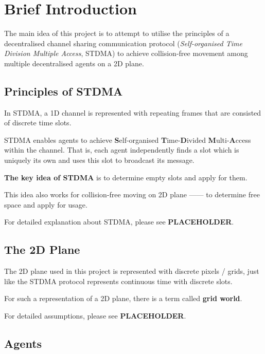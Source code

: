 \section{Brief Introduction}
\label{chap:Brief Introduction}
The main idea of this project is to attempt to utilise the principles of a decentralised channel sharing communication protocol (\textit{Self-organised Time Division Multiple Access}, STDMA\cite{STDMA}) to achieve collision-free movement among multiple decentralised agents on a 2D plane.

\subsection{Principles of STDMA}


In STDMA, a 1D channel is represented with repeating frames that are consisted of discrete time slots.

STDMA enables agents to achieve \textbf{S}elf-organised \textbf{T}ime-\textbf{D}ivided \textbf{M}ulti-\textbf{A}ccess within the channel. That is, each agent independently finds a slot which is uniquely its own and uses this slot to broadcast its message.

\textbf{The key idea of STDMA} is to determine empty slots and apply for them.

This idea also works for collision-free moving on 2D plane —— to determine free space and apply for usage.

For detailed explanation about STDMA, please see \textbf{PLACEHOLDER}.

\subsection{The 2D Plane}

The 2D plane used in this project is represented with discrete pixels / grids, just like the STDMA protocol represents continuous time with discrete slots.

For such a representation of a 2D plane, there is a term called \textbf{grid world}\cite{GridWorld}.

For detailed assumptions, please see \textbf{PLACEHOLDER}.

\subsection{Agents}

